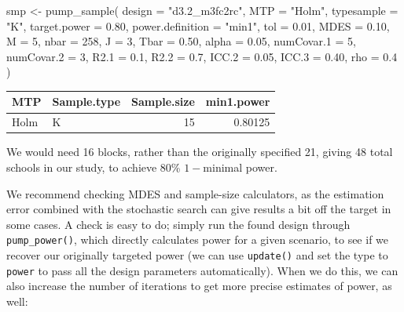 \documentclass[
]{article}
\newenvironment{Shaded}{\begin{snugshade}}{\end{snugshade}}
\newcommand{\AttributeTok}[1]{\textcolor[rgb]{0.77,0.63,0.00}{#1}}
\newcommand{\DecValTok}[1]{\textcolor[rgb]{0.00,0.00,0.81}{#1}}
\newcommand{\FloatTok}[1]{\textcolor[rgb]{0.00,0.00,0.81}{#1}}
\newcommand{\FunctionTok}[1]{\textcolor[rgb]{0.00,0.00,0.00}{#1}}
\newcommand{\NormalTok}[1]{#1}
\newcommand{\OtherTok}[1]{\textcolor[rgb]{0.56,0.35,0.01}{#1}}
\newcommand{\StringTok}[1]{\textcolor[rgb]{0.31,0.60,0.02}{#1}}
\begin{document}
\begin{Shaded}
\begin{Highlighting}[]
\NormalTok{smp }\OtherTok{\textless{}{-}} \FunctionTok{pump\_sample}\NormalTok{(}
  \AttributeTok{design =} \StringTok{"d3.2\_m3fc2rc"}\NormalTok{,}
  \AttributeTok{MTP =} \StringTok{"Holm"}\NormalTok{,}
  \AttributeTok{typesample =} \StringTok{"K"}\NormalTok{,}
  \AttributeTok{target.power =} \FloatTok{0.80}\NormalTok{, }\AttributeTok{power.definition =} \StringTok{"min1"}\NormalTok{, }\AttributeTok{tol =} \FloatTok{0.01}\NormalTok{,}
  \AttributeTok{MDES =} \FloatTok{0.10}\NormalTok{, }\AttributeTok{M =} \DecValTok{5}\NormalTok{, }\AttributeTok{nbar =} \DecValTok{258}\NormalTok{, }\AttributeTok{J =} \DecValTok{3}\NormalTok{,}
  \AttributeTok{Tbar =} \FloatTok{0.50}\NormalTok{, }\AttributeTok{alpha =} \FloatTok{0.05}\NormalTok{, }\AttributeTok{numCovar.1 =} \DecValTok{5}\NormalTok{, }\AttributeTok{numCovar.2 =} \DecValTok{3}\NormalTok{,}
  \AttributeTok{R2.1 =} \FloatTok{0.1}\NormalTok{, }\AttributeTok{R2.2 =} \FloatTok{0.7}\NormalTok{, }\AttributeTok{ICC.2 =} \FloatTok{0.05}\NormalTok{, }\AttributeTok{ICC.3 =} \FloatTok{0.40}\NormalTok{, }\AttributeTok{rho =} \FloatTok{0.4}\NormalTok{ )}
\end{Highlighting}
\end{Shaded}

\begin{tabular}{l|l|r|r}
\hline
MTP & Sample.type & Sample.size & min1.power\\
\hline
Holm & K & 15 & 0.80125\\
\hline
\end{tabular}

We would need 16 blocks, rather than the originally specified 21, giving
48 total schools in our study, to achieve 80\% \(1-\)minimal power.

We recommend checking MDES and sample-size calculators, as the
estimation error combined with the stochastic search can give results a
bit off the target in some cases. A check is easy to do; simply run the
found design through \texttt{pump\_power()}, which directly calculates
power for a given scenario, to see if we recover our originally targeted
power (we can use \texttt{update()} and set the type to \texttt{power}
to pass all the design parameters automatically). When we do this, we
can also increase the number of iterations to get more precise estimates
of power, as well:
\end{document}
